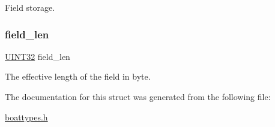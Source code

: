 Field storage. 

\mbox{\label{struct_t_tx_field_max4_b_a37f1b9ab89b19244af4f685f3b6e384a}} 
\subsubsection{\texorpdfstring{field\+\_\+len}{field\_len}}
{\footnotesize\ttfamily \mbox{\hyperlink{boattypes_8h_ae1e6edbbc26d6fbc71a90190d0266018}{U\+I\+N\+T32}} field\+\_\+len}



The effective length of the field in byte. 



The documentation for this struct was generated from the following file\+:\begin{DoxyCompactItemize}
\item 
\mbox{\hyperlink{boattypes_8h}{boattypes.\+h}}\end{DoxyCompactItemize}
